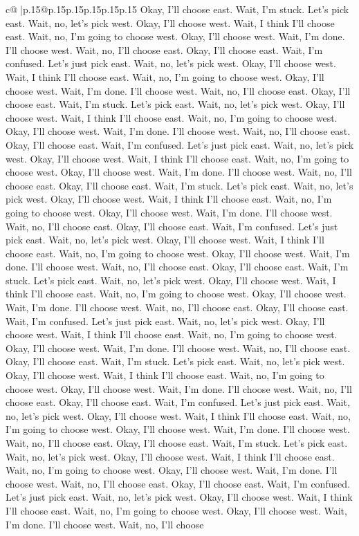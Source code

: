 \documentclass{article}
\begin{document}
{\begin{supertabular}{c@{$\;$}|p{.15\linewidth}@{}p{.15\linewidth}p{.15\linewidth}p{.15\linewidth}p{.15\linewidth}p{.15\linewidth}}
{{{Okay, I'll choose east. Wait, I'm stuck. Let's pick east. Wait, no, let's pick west. Okay, I'll choose west. Wait, I think I'll choose east. Wait, no, I'm going to choose west. Okay, I'll choose west. Wait, I'm done. I'll choose west. Wait, no, I'll choose east. Okay, I'll choose east. Wait, I'm confused. Let's just pick east. Wait, no, let's pick west. Okay, I'll choose west. Wait, I think I'll choose east. Wait, no, I'm going to choose west. Okay, I'll choose west. Wait, I'm done. I'll choose west. Wait, no, I'll choose east. Okay, I'll choose east. Wait, I'm stuck. Let's pick east. Wait, no, let's pick west. Okay, I'll choose west. Wait, I think I'll choose east. Wait, no, I'm going to choose west. Okay, I'll choose west. Wait, I'm done. I'll choose west. Wait, no, I'll choose east. Okay, I'll choose east. Wait, I'm confused. Let's just pick east. Wait, no, let's pick west. Okay, I'll choose west. Wait, I think I'll choose east. Wait, no, I'm going to choose west. Okay, I'll choose west. Wait, I'm done. I'll choose west. Wait, no, I'll choose east. Okay, I'll choose east. Wait, I'm stuck. Let's pick east. Wait, no, let's pick west. Okay, I'll choose west. Wait, I think I'll choose east. Wait, no, I'm going to choose west. Okay, I'll choose west. Wait, I'm done. I'll choose west. Wait, no, I'll choose east. Okay, I'll choose east. Wait, I'm confused. Let's just pick east. Wait, no, let's pick west. Okay, I'll choose west. Wait, I think I'll choose east. Wait, no, I'm going to choose west. Okay, I'll choose west. Wait, I'm done. I'll choose west. Wait, no, I'll choose east. Okay, I'll choose east. Wait, I'm stuck. Let's pick east. Wait, no, let's pick west. Okay, I'll choose west. Wait, I think I'll choose east. Wait, no, I'm going to choose west. Okay, I'll choose west. Wait, I'm done. I'll choose west. Wait, no, I'll choose east. Okay, I'll choose east. Wait, I'm confused. Let's just pick east. Wait, no, let's pick west. Okay, I'll choose west. Wait, I think I'll choose east. Wait, no, I'm going to choose west. Okay, I'll choose west. Wait, I'm done. I'll choose west. Wait, no, I'll choose east. Okay, I'll choose east. Wait, I'm stuck. Let's pick east. Wait, no, let's pick west. Okay, I'll choose west. Wait, I think I'll choose east. Wait, no, I'm going to choose west. Okay, I'll choose west. Wait, I'm done. I'll choose west. Wait, no, I'll choose east. Okay, I'll choose east. Wait, I'm confused. Let's just pick east. Wait, no, let's pick west. Okay, I'll choose west. Wait, I think I'll choose east. Wait, no, I'm going to choose west. Okay, I'll choose west. Wait, I'm done. I'll choose west. Wait, no, I'll choose east. Okay, I'll choose east. Wait, I'm stuck. Let's pick east. Wait, no, let's pick west. Okay, I'll choose west. Wait, I think I'll choose east. Wait, no, I'm going to choose west. Okay, I'll choose west. Wait, I'm done. I'll choose west. Wait, no, I'll choose east. Okay, I'll choose east. Wait, I'm confused. Let's just pick east. Wait, no, let's pick west. Okay, I'll choose west. Wait, I think I'll choose east. Wait, no, I'm going to choose west. Okay, I'll choose west. Wait, I'm done. I'll choose west. Wait, no, I'll choose }}}
\end{supertabular}}
\end{document}
